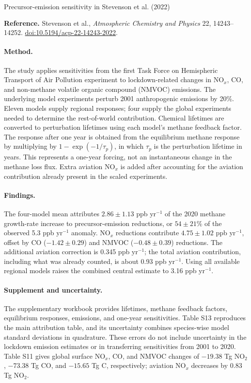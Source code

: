 \documentclass[11pt]{article}
\begin{document}
\begin{center}\large Precursor-emission sensitivity in Stevenson et al. (2022)\end{center}
\noindent\textbf{Reference.} Stevenson et al., \emph{Atmospheric Chemistry and
Physics} 22, 14243--14252.\newline
\href{https://doi.org/10.5194/acp-22-14243-2022}{doi:10.5194/acp-22-14243-2022}.

\paragraph{Method.} The study applies sensitivities from the first Task Force on
Hemispheric Transport of Air Pollution experiment to lockdown-related changes
in NO$_x$, CO, and non-methane volatile organic compound (NMVOC) emissions.
The underlying model experiments perturb 2001 anthropogenic emissions by 20\%.
Eleven models supply regional responses; four supply the global experiments
needed to determine the rest-of-world contribution. Chemical lifetimes are
converted to perturbation lifetimes using each model's methane feedback factor.
The response after one year is obtained from the equilibrium methane response
by multiplying by $1-\exp(-1/\tau_p)$, in which $\tau_p$ is the perturbation
lifetime in years. This represents a one-year forcing, not an instantaneous
change in the methane loss flux. Extra aviation NO$_x$ is added after accounting
for the aviation contribution already present in the scaled experiments.

\paragraph{Findings.} The four-model mean attributes $2.86\pm1.13$ ppb yr$^{-1}$
of the 2020 methane growth-rate increase to precursor-emission reductions,
or $54\pm21$\% of the observed 5.3 ppb yr$^{-1}$ anomaly. NO$_x$ reductions
contribute $4.75\pm1.02$ ppb yr$^{-1}$, offset by CO ($-1.42\pm0.29$) and
NMVOC ($-0.48\pm0.39$) reductions. The additional aviation correction is
0.345 ppb yr$^{-1}$; the total aviation contribution, including what was already
counted, is about 0.93 ppb yr$^{-1}$. Using all available regional models raises
the combined central estimate to 3.16 ppb yr$^{-1}$.

\paragraph{Supplement and uncertainty.} The supplementary workbook provides
lifetimes, methane feedback factors, equilibrium responses, emissions, and
one-year sensitivities. Table S13 reproduces the main attribution table, and its
uncertainty combines species-wise model standard deviations in quadrature.
These errors do not include uncertainty in the lockdown emission estimates or
in transferring sensitivities from 2001 to 2020. Table S11 gives global surface
NO$_x$, CO, and NMVOC changes of $-19.38$ Tg NO$_2$, $-73.38$ Tg CO, and
$-15.65$ Tg C, respectively; aviation NO$_x$ decreases by 0.83 Tg NO$_2$.
\end{document}
